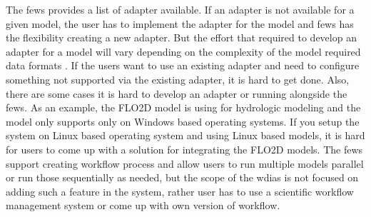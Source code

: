 The \acrshort{fews} provides a list of adapter available. If an adapter is not available for a given model, the user has to implement the adapter for the model and \acrshort{fews} has the flexibility creating a new adapter. But the effort that required to develop an adapter for a model will vary depending on the complexity of the model required data formats \cite{Werner2013TheSystem}. If the users want to use an existing adapter and need to configure something not supported via the existing adapter, it is hard to get done. Also, there are some cases it is hard to develop an adapter or running alongside the \acrshort{fews}. As an example, the FLO2D model is using for hydrologic modeling and the model only supports only on Windows based operating systems. If you setup the system on Linux based operating system and using Linux based models, it is hard for users to come up with a solution for integrating the FLO2D models.
The \acrshort{fews} support creating workflow process and allow users to run multiple models parallel or run those sequentially as needed, but the scope of the \acrshort{wdias} is not focused on adding such a feature in the system, rather user has to use a scientific workflow management system or come up with own version of workflow.
